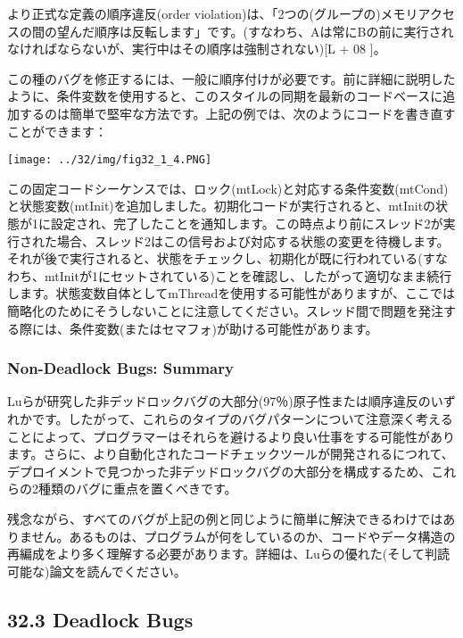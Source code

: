 より正式な定義の順序違反(order
violation)は、「2つの(グループの)メモリアクセスの間の望んだ順序は反転します」です。(すなわち、Aは常にBの前に実行されなければならないが、実行中はその順序は強制されない){[}L
+ 08 {]}。

この種のバグを修正するには、一般に順序付けが必要です。前に詳細に説明したように、条件変数を使用すると、このスタイルの同期を最新のコードベースに追加するのは簡単で堅牢な方法です。上記の例では、次のようにコードを書き直すことができます：

\texttt{[image: ../32/img/fig32\_1\_4.PNG]}

この固定コードシーケンスでは、ロック(mtLock)と対応する条件変数(mtCond)と状態変数(mtInit)を追加しました。初期化コードが実行されると、mtInitの状態が1に設定され、完了したことを通知します。この時点より前にスレッド2が実行された場合、スレッド2はこの信号および対応する状態の変更を待機します。それが後で実行されると、状態をチェックし、初期化が既に行われている(すなわち、mtInitが1にセットされている)ことを確認し、したがって適切なまま続行します。状態変数自体としてmThreadを使用する可能性がありますが、ここでは簡略化のためにそうしないことに注意してください。スレッド間で問題を発注する際には、条件変数(またはセマフォ)が助ける可能性があります。

\hypertarget{non-deadlock-bugs-summary}{%
\subsubsection*{Non-Deadlock Bugs:
Summary}\label{non-deadlock-bugs-summary}}

Luらが研究した非デッドロックバグの大部分(97％)原子性または順序違反のいずれかです。したがって、これらのタイプのバグパターンについて注意深く考えることによって、プログラマーはそれらを避けるより良い仕事をする可能性があります。さらに、より自動化されたコードチェックツールが開発されるにつれて、デプロイメントで見つかった非デッドロックバグの大部分を構成するため、これらの2種類のバグに重点を置くべきです。

残念ながら、すべてのバグが上記の例と同じように簡単に解決できるわけではありません。あるものは、プログラムが何をしているのか、コードやデータ構造の再編成をより多く理解する必要があります。詳細は、Luらの優れた(そして判読可能な)論文を読んでください。

\hypertarget{deadlock-bugs}{%
\subsection*{32.3 Deadlock Bugs}\label{deadlock-bugs}}

